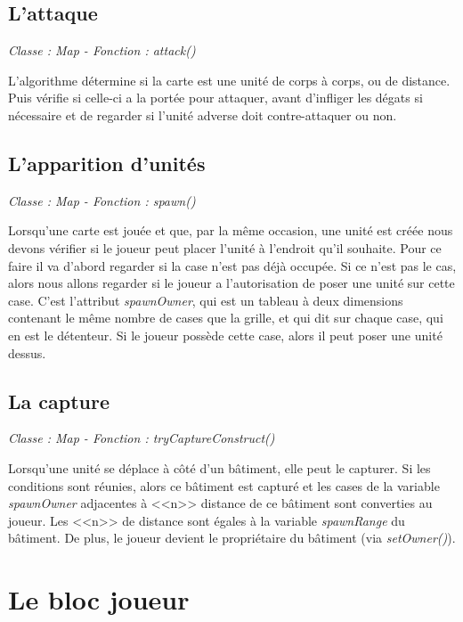 \documentclass[a4paper, titlepage]{livret}
\begin{document}
        \subsection{L'attaque}
        \begin{center}
        \textit{Classe : Map - Fonction : attack()}
        \end{center}
        L'algorithme détermine si la carte est une unité de corps à corps, ou de distance. Puis vérifie si celle-ci a la portée pour attaquer, avant d'infliger les dégats si nécessaire et de regarder si l'unité adverse doit contre-attaquer ou non.
          
        \subsection{L'apparition d'unités}
          \begin{center}
          \textit{Classe : Map - Fonction : spawn()}
          \end{center}
            Lorsqu'une carte est jouée et que, par la même occasion, une unité est créée nous devons vérifier si le joueur peut placer l'unité à l'endroit qu'il souhaite. Pour ce faire il va d'abord regarder si la case n'est pas déjà occupée. Si ce n'est pas le cas, alors nous allons regarder si le joueur a l'autorisation de poser une unité sur cette case. C'est l'attribut \textit{spawnOwner}, qui est un tableau à deux dimensions contenant le même nombre de cases que la grille, et qui dit sur chaque case, qui en est le détenteur. Si le joueur possède cette case, alors il peut poser une unité dessus.

        
        \subsection{La capture}
          \begin{center}
           \textit{Classe : Map - Fonction : tryCaptureConstruct()}
          \end{center}
          Lorsqu'une unité se déplace à côté d'un bâtiment, elle peut le capturer. Si les conditions sont réunies, alors ce bâtiment est capturé et les cases de la variable \textit{spawnOwner} adjacentes à <<n>> distance de ce bâtiment sont converties au joueur. Les <<n>> de distance sont égales à la variable \textit{spawnRange} du bâtiment. De plus, le joueur devient le propriétaire du bâtiment (via \textit{setOwner()}).
      
      \section{Le bloc joueur}
\end{document}
